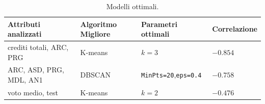 \documentclass[12pt]{article}
\begin{document}
\begin{table}[H]
\begin{adjustbox}{max width=\textwidth}
\begin{tabular}{@{}llll@{}}
\toprule
Attributi analizzati     & Algoritmo Migliore & Parametri ottimali & Correlazione \\ \midrule
crediti totali, ARC, PRG & K-means            & $k=3$                & $-0.854$       \\
ARC, ASD, PRG, MDL, AN1  & DBSCAN             & \texttt{MinPts=20},\texttt{eps=0.4}  & $-0.758$ \\
voto medio, test         & K-means            & $k=2$                & $-0.476$       \\ \bottomrule
\end{tabular}
\end{adjustbox}
\caption{Modelli ottimali.}
\label{tab:mod-opt}
\end{table}

\newpage
\end{document}

